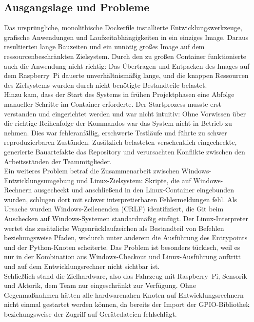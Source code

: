 \subsection{Ausgangslage und Probleme}
\label{sec:container_probleme}
Das ursprüngliche, monolithische Dockerfile installierte Entwicklungswerkzeuge, grafische Anwendungen und Laufzeitabhängigkeiten in ein einziges Image. Daraus resultierten lange Bauzeiten und ein unnötig großes Image auf dem ressourcenbeschränkten Zielsystem. Durch den zu großen Container funktionierte auch die Anwendung nicht richtig: Das Übertragen und Entpacken des Images auf dem Raspberry~Pi dauerte unverhältnismäßig lange, und die knappen Ressourcen des Zielsystems wurden durch nicht benötigte Bestandteile belastet.
\\
Hinzu kam, dass der Start des Systems in frühen Projektphasen eine Abfolge manueller Schritte im Container erforderte. Der Startprozess musste erst verstanden und eingerichtet werden und war nicht intuitiv: Ohne Vorwissen über die richtige Reihenfolge der Kommandos war das System nicht in Betrieb zu nehmen. Dies war fehleranfällig, erschwerte Testläufe und führte zu schwer reproduzierbaren Zuständen. Zusätzlich belasteten versehentlich eingecheckte, generierte Bauartefakte das Repository und verursachten Konflikte zwischen den Arbeitsständen der Teammitglieder.
\\
Ein weiteres Problem betraf die Zusammenarbeit zwischen Windows-Entwicklungsumgebung und Linux-Zielsystem: Skripte, die auf Windows-Rechnern ausgecheckt und anschließend in den Linux-Container eingebunden wurden, schlugen dort mit schwer interpretierbaren Fehlermeldungen fehl. Als Ursache wurden Windows-Zeilenenden (CRLF) identifiziert, die Git beim Auschecken auf Windows-Systemen standardmäßig einfügt. Der Linux-Interpreter wertet das zusätzliche Wagenrücklaufzeichen als Bestandteil von Befehlen beziehungsweise Pfaden, wodurch unter anderem die Ausführung des Entrypoints und der Python-Knoten scheiterte. Das Problem ist besonders tückisch, weil es nur in der Kombination aus Windows-Checkout und Linux-Ausführung auftritt und auf dem Entwicklungsrechner nicht sichtbar ist.
\\
Schließlich stand die Zielhardware, also das Fahrzeug mit Raspberry~Pi, Sensorik und Aktorik, dem Team nur eingeschränkt zur Verfügung. Ohne Gegenmaßnahmen hätten alle hardwarenahen Knoten auf Entwicklungsrechnern nicht einmal gestartet werden können, da bereits der Import der GPIO-Bibliothek beziehungsweise der Zugriff auf Gerätedateien fehlschlägt.

